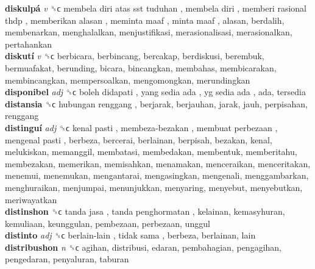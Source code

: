 \textbf{diskulpá} \emph{v}  ␝ϲ   membela diri  atas sst tuduhan ,  membela diri ,  memberi rasional thdp ,  memberikan alasan ,  meminta maaf ,  minta maaf , alasan, berdalih, membenarkan, menghalalkan, menjustifikasi, merasionalisasi, merasionalkan, pertahankan  \\
\textbf{diskutí} \emph{v}  ␝ϲ  berbicara, berbincang, bercakap, berdiskusi, berembuk, bermuafakat, berunding, bicara, bincangkan, membahas, membicarakan, membincangkan, mempersoalkan, mengomongkan, merundingkan  \\
\textbf{disponibel} \emph{adj}  ␝ϲ   boleh didapati ,  yang sedia ada ,  yg sedia ada , ada, tersedia  \\
\textbf{distansia} ␝ϲ   hubungan renggang , berjarak, berjauhan, jarak, jauh, perpisahan, renggang  \\
\textbf{distinguí} \emph{adj}  ␝ϲ   kenal pasti ,  membeza-bezakan ,  membuat perbezaan ,  mengenal pasti , berbeza, bercerai, berlainan, berpisah, bezakan, kenal, melukiskan, memanggil, membatasi, membedakan, membentuk, memberitahu, membezakan, memerikan, memisahkan, menamakan, menceraikan, menceritakan, menemui, menemukan, mengantarai, mengasingkan, mengenali, menggambarkan, menghuraikan, menjumpai, menunjukkan, menyaring, menyebut, menyebutkan, meriwayatkan  \\
\textbf{distinshon} ␝ϲ   tanda jasa ,  tanda penghormatan , kelainan, kemasyhuran, kemuliaan, keunggulan, pembezaan, perbezaan, unggul  \\
\textbf{distinto} \emph{adj}  ␝ϲ   berlain-lain ,  tidak sama , berbeza, berlainan, lain  \\
\textbf{distribushon} \emph{n}  ␝ϲ  agihan, distribusi, edaran, pembahagian, pengagihan, pengedaran, penyaluran, taburan  \\
